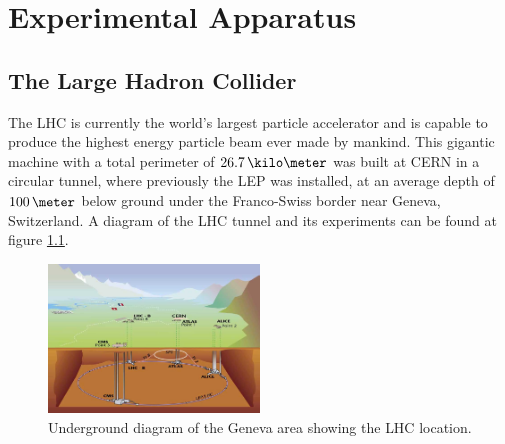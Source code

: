 \chapter{Experimental Apparatus}
\label{CHAPTER:ExperimentalApparatus}

\section{The Large Hadron Collider}
\label{SECTION:ExperimentalApparatus_LHC}

%

%  

The \gls{LHC}\cite{ARTICLE:LHC Machine} is currently the world's largest particle accelerator and is capable to produce the highest energy particle beam ever made by mankind. This gigantic machine with a total perimeter of $26.7\,\kilo\meter$ was built at \gls{CERN} in a circular tunnel, where previously the \gls{LEP}\cite{LEPTDR:LEPInjectorStudyGroup} was installed, at an average depth of $100\,\meter$ below ground under the Franco-Swiss border near Geneva, Switzerland. A diagram of the \gls{LHC} tunnel and its experiments can be found at figure \ref{FIGURE:ExperimentalApparatus_LHCLayoutUnderground}.

\begin{figure}[!htb]
  \centering
  \includegraphics[width=0.50\textwidth]{Chapter02/LHC/Images/LHC_layout_underground.jpg}
  \caption{Underground diagram of the Geneva area showing the \gls{LHC} location.}
  \label{FIGURE:ExperimentalApparatus_LHCLayoutUnderground}
\end{figure}

